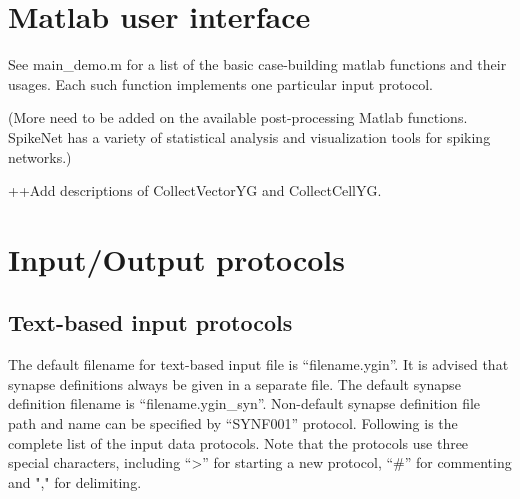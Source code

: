 \documentclass{article}
\begin{document}
%	





\section{Matlab user interface}
\label{sec:matlab user interface}
See main\_demo.m for a list of the basic case-building matlab functions and their usages. Each such function implements one particular input protocol. 


(More need to be added on the available post-processing Matlab functions. SpikeNet has a variety of statistical analysis and visualization tools for spiking networks.)

++Add  descriptions of CollectVectorYG and CollectCellYG.

\section{Input/Output protocols}
\label{sec:IO protocols}
\subsection{Text-based input protocols}
The default filename for text-based input file is ``filename.ygin''.
It is advised that synapse definitions always be given in a separate file.
The default synapse definition filename is ``filename.ygin\_syn''.
Non-default synapse definition file path and name can be specified by ``SYNF001'' protocol.
Following is the complete list of the input data protocols.
Note that the protocols use three special characters, including ``\textgreater'' for starting a new protocol, ``\#'' for commenting and "," for delimiting.
\end{document}

